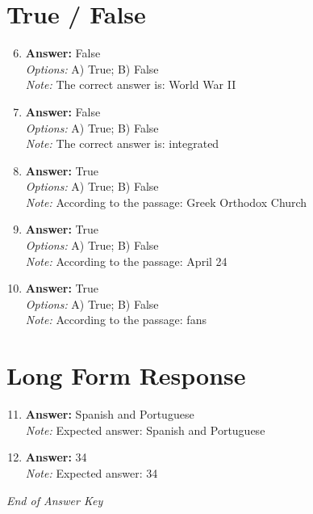 \documentclass[12pt]{article}
\begin{document}
\section*{True / False}
\begin{enumerate}[label=\arabic*.]
\setcounter{enumi}{5}
\item \textbf{Answer:} False
\\ \textit{Options:} A) True; B) False
\\ \textit{Note:} The correct answer is: World War II
\item \textbf{Answer:} False
\\ \textit{Options:} A) True; B) False
\\ \textit{Note:} The correct answer is: integrated
\item \textbf{Answer:} True
\\ \textit{Options:} A) True; B) False
\\ \textit{Note:} According to the passage: Greek Orthodox Church
\item \textbf{Answer:} True
\\ \textit{Options:} A) True; B) False
\\ \textit{Note:} According to the passage: April 24
\item \textbf{Answer:} True
\\ \textit{Options:} A) True; B) False
\\ \textit{Note:} According to the passage: fans
\end{enumerate}

\section*{Long Form Response}
\begin{enumerate}[label=\arabic*.]
\setcounter{enumi}{10}
\item \textbf{Answer:} Spanish and Portuguese
\\ \textit{Note:} Expected answer: Spanish and Portuguese
\item \textbf{Answer:} 34
\\ \textit{Note:} Expected answer: 34
\end{enumerate}

\vfill
\noindent\textit{End of Answer Key}
\end{document}
